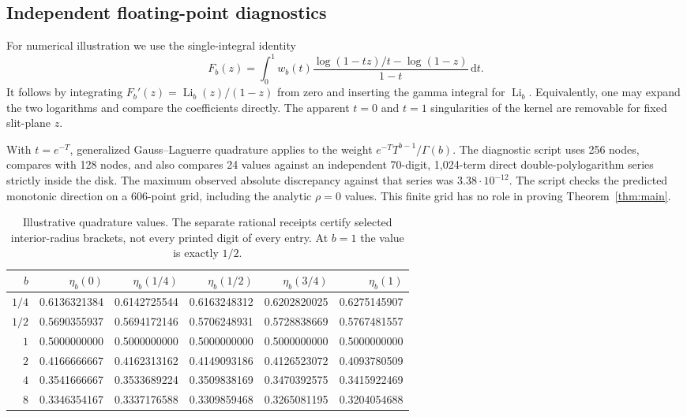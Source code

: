 \documentclass[11pt]{article}
\numberwithin{equation}{section}
\theoremstyle{definition}
\theoremstyle{remark}
\DeclareMathOperator{\Li}{Li}
\newcommand{\dd}{\,\mathrm d}
\begin{document}
\subsection{Independent floating-point diagnostics}
For numerical illustration we use the single-integral identity
\begin{equation}\label{eq:numericalintegral}
 F_b(z)=\int_0^1 w_b(t)
 \frac{\log(1-tz)/t-\log(1-z)}{1-t}\dd t.
\end{equation}
It follows by integrating $F_b'(z)=\Li_b(z)/(1-z)$ from zero and
inserting the gamma integral for $\Li_b$. Equivalently, one may
expand the two logarithms and compare the coefficients directly.
The apparent $t=0$ and $t=1$ singularities of the kernel are removable
for fixed slit-plane $z$.

With $t=e^{-T}$, generalized Gauss--Laguerre quadrature applies to the
weight $e^{-T}T^{b-1}/\Gamma(b)$. The diagnostic script uses 256 nodes,
compares with 128 nodes, and also compares 24 values against an
independent 70-digit, 1,024-term direct double-polylogarithm series
strictly inside the disk. The maximum observed absolute discrepancy
against that series was $3.38\cdot10^{-12}$. The script checks the
predicted monotonic direction on a 606-point grid, including the
analytic $\rho=0$ values. This finite grid has no role in proving
Theorem~\ref{thm:main}.

\begin{table}[tbp]
\centering
\small
\begin{tabular}{@{}rrrrrr@{}}
\toprule
$b$ & $\eta_b(0)$ & $\eta_b(1/4)$ & $\eta_b(1/2)$
    & $\eta_b(3/4)$ & $\eta_b(1)$\\
\midrule
$1/4$&0.6136321384&0.6142725544&0.6163248312&0.6202820025&0.6275145907\\
$1/2$&0.5690355937&0.5694172146&0.5706248931&0.5728838669&0.5767481557\\
$1$&0.5000000000&0.5000000000&0.5000000000&0.5000000000&0.5000000000\\
$2$&0.4166666667&0.4162313162&0.4149093186&0.4126523072&0.4093780509\\
$4$&0.3541666667&0.3533689224&0.3509838169&0.3470392575&0.3415922469\\
$8$&0.3346354167&0.3337176588&0.3309859468&0.3265081195&0.3204054688\\
\bottomrule
\end{tabular}
\caption{Illustrative quadrature values. The separate rational receipts
certify selected interior-radius brackets, not every printed digit of
every entry. At $b=1$ the value is exactly $1/2$.}
\label{tab:values}
\end{table}
\end{document}
